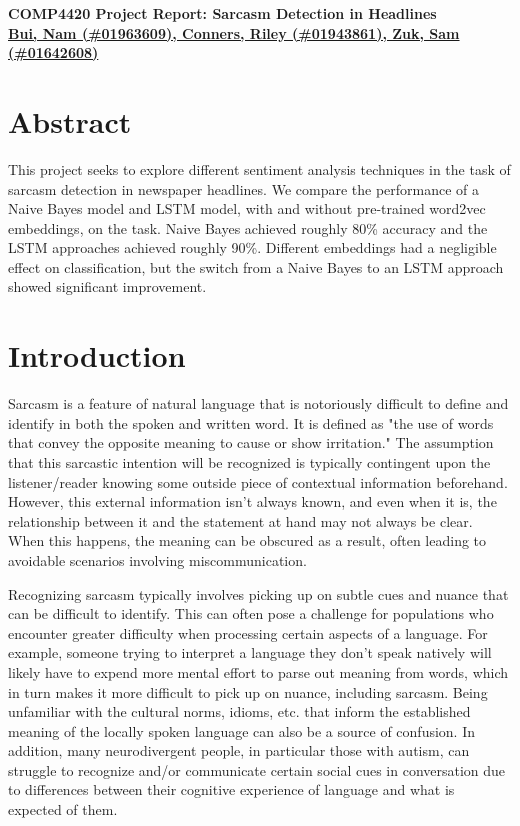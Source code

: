 \documentclass[11pt]{article}
\def\proptitle{COMP4420 Project Report: Sarcasm Detection in Headlines}
\def\propauthors{Bui, Nam (\#01963609), 
                 Conners, Riley (\#01943861), 
                 Zuk, Sam (\#01642608)}
\begin{document}
\begin{center}
    \textbf{\Large{\proptitle}} \\
    \textbf{\underline{\propauthors}}
\end{center}

\bigskip

\section{Abstract}

This project seeks to explore different sentiment analysis techniques in the
task of sarcasm detection in newspaper headlines. We compare the performance of
a Naive Bayes model and LSTM model, with and without pre-trained word2vec
embeddings, on the task. Naive Bayes achieved roughly 80\% accuracy and the
LSTM approaches achieved roughly 90\%. Different embeddings had a negligible
effect on classification, but the switch from a Naive Bayes to an LSTM approach
showed significant improvement.

\section{Introduction}

Sarcasm is a feature of natural language that is notoriously difficult to
define and identify in both the spoken and written word. It is defined as "the
use of words that convey the opposite meaning to cause or show irritation."
\cite{mw:sarcasm} The assumption that this sarcastic intention will be
recognized is typically contingent upon the listener/reader knowing some
outside piece of contextual information beforehand. However, this external
information isn't always known, and even when it is, the relationship between
it and the statement at hand may not always be clear. When this happens, the
meaning can be obscured as a result, often leading to avoidable scenarios
involving miscommunication.

Recognizing sarcasm typically involves picking up on subtle cues and nuance
that can be difficult to identify. This can often pose a challenge for
populations who encounter greater difficulty when processing certain aspects of
a language. For example, someone trying to interpret a language they don't
speak natively will likely have to expend more mental effort to parse out
meaning from words, which in turn makes it more difficult to pick up on nuance,
including sarcasm. Being unfamiliar with the cultural norms, idioms, etc. that
inform the established meaning of the locally spoken language can also be a
source of confusion. In addition, many neurodivergent people, in particular
those with autism, can struggle to recognize and/or communicate certain social
cues in conversation due to differences between their cognitive experience of
language and what is expected of them.
\end{document}
